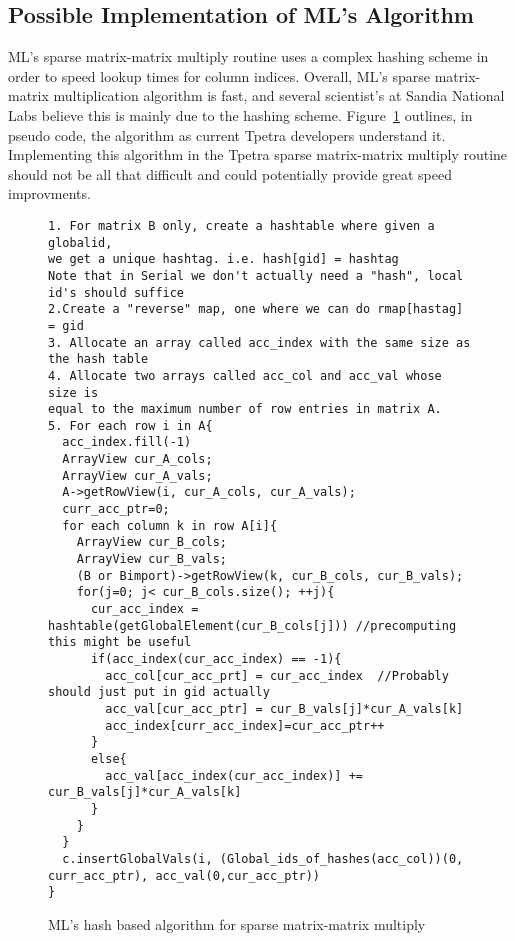 \documentclass[pdf,12pt]{SANDreport}
\begin{document}
\subsection{Possible Implementation of ML's Algorithm}
ML's sparse matrix-matrix multiply routine uses a complex hashing scheme in order to speed lookup times for 
column indices. Overall, ML's sparse matrix-matrix multiplication algorithm is fast, and several scientist's at Sandia 
National Labs believe this is mainly due to the hashing scheme. Figure~\ref{hashalgo} outlines, in pseudo code, the 
algorithm as current Tpetra developers understand it. Implementing this algorithm in the Tpetra sparse matrix-matrix 
multiply routine should not be all that difficult and could potentially provide great speed improvments.

\begin{figure}
\centering
{\footnotesize
\begin{verbatim}
1. For matrix B only, create a hashtable where given a globalid, 
we get a unique hashtag. i.e. hash[gid] = hashtag
Note that in Serial we don't actually need a "hash", local id's should suffice
2.Create a "reverse" map, one where we can do rmap[hastag] = gid
3. Allocate an array called acc_index with the same size as the hash table
4. Allocate two arrays called acc_col and acc_val whose size is 
equal to the maximum number of row entries in matrix A.
5. For each row i in A{
  acc_index.fill(-1)
  ArrayView cur_A_cols;
  ArrayView cur_A_vals;
  A->getRowView(i, cur_A_cols, cur_A_vals);
  curr_acc_ptr=0;
  for each column k in row A[i]{
    ArrayView cur_B_cols;
    ArrayView cur_B_vals;
    (B or Bimport)->getRowView(k, cur_B_cols, cur_B_vals);
    for(j=0; j< cur_B_cols.size(); ++j){
      cur_acc_index = hashtable(getGlobalElement(cur_B_cols[j])) //precomputing this might be useful
      if(acc_index(cur_acc_index) == -1){
        acc_col[cur_acc_prt] = cur_acc_index  //Probably should just put in gid actually
        acc_val[cur_acc_ptr] = cur_B_vals[j]*cur_A_vals[k]
        acc_index[curr_acc_index]=cur_acc_ptr++
      }
      else{
        acc_val[acc_index(cur_acc_index)] += cur_B_vals[j]*cur_A_vals[k]
      }
    }
  }
  c.insertGlobalVals(i, (Global_ids_of_hashes(acc_col))(0, curr_acc_ptr), acc_val(0,cur_acc_ptr))
}

\end{verbatim}
}
\caption[Hash based algorithm]{ML's hash based algorithm for sparse matrix-matrix multiply}
\label{hashalgo}
\end{figure}
\end{document}
